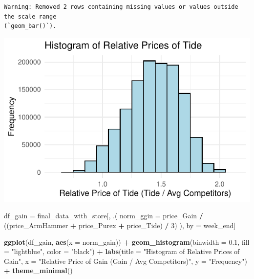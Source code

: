 \documentclass[
]{article}
\newenvironment{Shaded}{\begin{snugshade}}{\end{snugshade}}
\newcommand{\AttributeTok}[1]{\textcolor[rgb]{0.13,0.29,0.53}{#1}}
\newcommand{\DecValTok}[1]{\textcolor[rgb]{0.00,0.00,0.81}{#1}}
\newcommand{\FloatTok}[1]{\textcolor[rgb]{0.00,0.00,0.81}{#1}}
\newcommand{\FunctionTok}[1]{\textcolor[rgb]{0.13,0.29,0.53}{\textbf{#1}}}
\newcommand{\NormalTok}[1]{#1}
\newcommand{\OtherTok}[1]{\textcolor[rgb]{0.56,0.35,0.01}{#1}}
\newcommand{\SpecialCharTok}[1]{\textcolor[rgb]{0.81,0.36,0.00}{\textbf{#1}}}
\newcommand{\StringTok}[1]{\textcolor[rgb]{0.31,0.60,0.02}{#1}}
\begin{document}
\begin{verbatim}
Warning: Removed 2 rows containing missing values or values outside the scale range
(`geom_bar()`).
\end{verbatim}

\begin{flushright}\includegraphics{Base-Pricing_files/figure-latex/unnamed-chunk-18-1} \end{flushright}

\begin{Shaded}
\begin{Highlighting}[]
\NormalTok{df\_gain }\OtherTok{=}\NormalTok{ final\_data\_with\_store[, .(}
  \AttributeTok{norm\_ggin =}\NormalTok{ price\_Gain }\SpecialCharTok{/}\NormalTok{ ((price\_ArmHammer }\SpecialCharTok{+}\NormalTok{ price\_Purex }\SpecialCharTok{+}\NormalTok{ price\_Tide) }\SpecialCharTok{/} \DecValTok{3}\NormalTok{)}
\NormalTok{), by }\OtherTok{=}\NormalTok{ week\_end]}

\FunctionTok{ggplot}\NormalTok{(df\_gain, }\FunctionTok{aes}\NormalTok{(}\AttributeTok{x =}\NormalTok{ norm\_gain)) }\SpecialCharTok{+} 
  \FunctionTok{geom\_histogram}\NormalTok{(}\AttributeTok{binwidth =} \FloatTok{0.1}\NormalTok{, }\AttributeTok{fill =} \StringTok{"lightblue"}\NormalTok{, }\AttributeTok{color =} \StringTok{"black"}\NormalTok{) }\SpecialCharTok{+}
  \FunctionTok{labs}\NormalTok{(}\AttributeTok{title =} \StringTok{"Histogram of Relative Prices of Gain"}\NormalTok{,}
       \AttributeTok{x =} \StringTok{"Relative Price of Gain (Gain / Avg Competitors)"}\NormalTok{,}
       \AttributeTok{y =} \StringTok{"Frequency"}\NormalTok{) }\SpecialCharTok{+}
  \FunctionTok{theme\_minimal}\NormalTok{()}
\end{Highlighting}
\end{Shaded}
\end{document}
